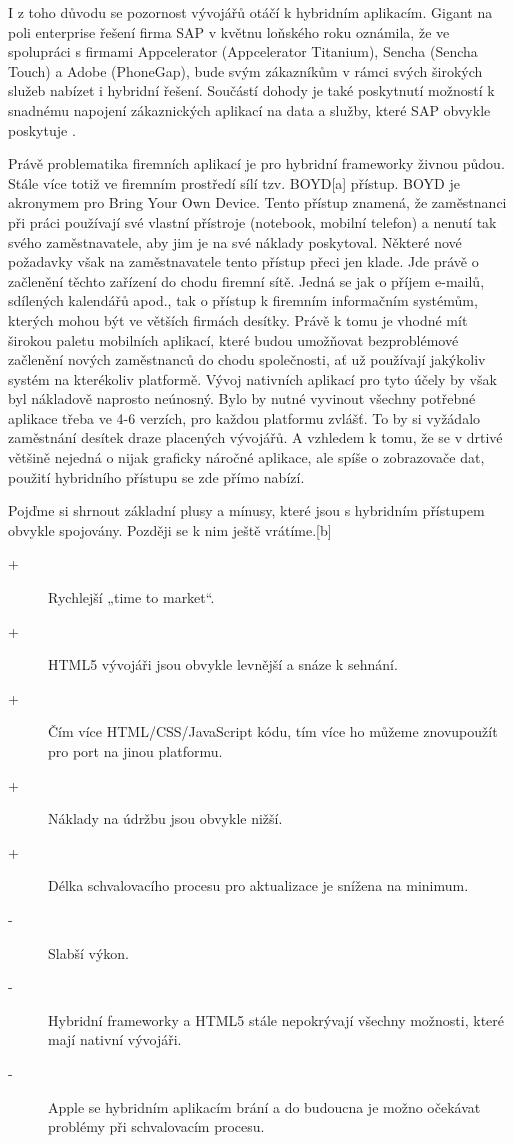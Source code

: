 I z toho důvodu se pozornost vývojářů otáčí k hybridním aplikacím. Gigant na poli enterprise řešení firma SAP v květnu loňského roku oznámila, že ve spolupráci s firmami Appcelerator (Appcelerator Titanium), Sencha (Sencha Touch) a Adobe (PhoneGap), bude svým zákazníkům v rámci svých širokých služeb nabízet i hybridní řešení. Součástí dohody je také poskytnutí možností k snadnému napojení zákaznických aplikací na data a služby, které SAP obvykle poskytuje \cite{bii_hybrid_apps_report}.

Právě problematika firemních aplikací je pro hybridní frameworky živnou půdou. Stále více totiž ve firemním prostředí sílí tzv. BOYD[a] přístup. BOYD je akronymem pro Bring Your Own Device. Tento přístup znamená, že zaměstnanci při práci používají své vlastní přístroje (notebook, mobilní telefon) a nenutí tak svého zaměstnavatele, aby jim je na své náklady poskytoval. Některé nové požadavky však na zaměstnavatele tento přístup přeci jen klade. Jde právě o začlenění těchto zařízení do chodu firemní sítě. Jedná se jak o příjem e-mailů, sdílených kalendářů apod., tak o přístup k firemním informačním systémům, kterých mohou být ve větších firmách desítky. Právě k tomu je vhodné mít širokou paletu mobilních aplikací, které budou umožňovat bezproblémové začlenění nových zaměstnanců do chodu společnosti, ať už používají jakýkoliv systém na kterékoliv platformě. Vývoj nativních aplikací pro tyto účely by však byl nákladově naprosto neúnosný. Bylo by nutné vyvinout všechny potřebné aplikace třeba ve 4-6 verzích, pro každou platformu zvlášť. To by si vyžádalo zaměstnání desítek draze placených vývojářů. A vzhledem k tomu, že se v drtivé většině nejedná o nijak graficky náročné aplikace, ale spíše o zobrazovače dat, použití hybridního přístupu se zde přímo nabízí. 

Pojďme si shrnout základní plusy a mínusy, které jsou s hybridním přístupem obvykle spojovány. Později se k nim ještě vrátíme.[b]

\begin{description}
        \item[+] Rychlejší „time to market“.
        \item[+] HTML5 vývojáři jsou obvykle levnější a snáze k sehnání.
        \item[+] Čím více HTML/CSS/JavaScript kódu, tím více ho můžeme znovupoužít pro port na jinou platformu.
        \item[+] Náklady na údržbu jsou obvykle nižší.
        \item[+] Délka schvalovacího procesu pro aktualizace je snížena na minimum.
        \item[-] Slabší výkon.
        \item[-] Hybridní frameworky a HTML5 stále nepokrývají všechny možnosti, které mají nativní vývojáři.
        \item[-] Apple se hybridním aplikacím brání a do budoucna je možno očekávat problémy při schvalovacím procesu.
\end{description}


